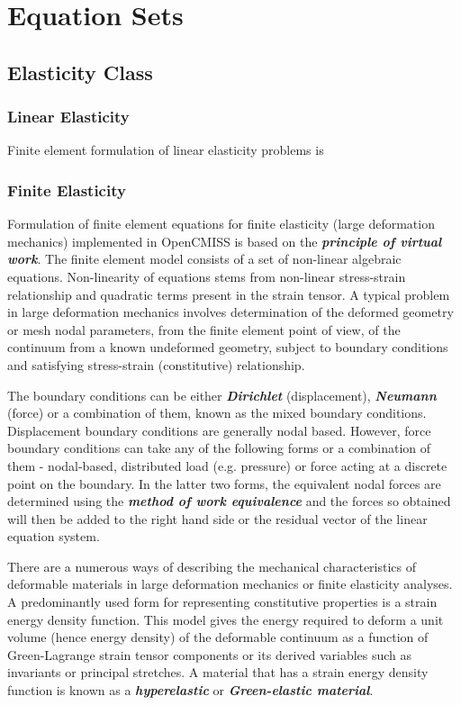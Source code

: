 \clearemptydoublepage
\chapter{Equation Sets}
\label{cha:equationsets}

\section{Elasticity Class}

\subsection{Linear Elasticity}

Finite element formulation of linear elasticity problems is

\subsection{Finite Elasticity}

Formulation of finite element equations for finite elasticity (large deformation mechanics) implemented in OpenCMISS is based on the 
\textit{\textbf{principle of virtual work}}. The finite element model consists of a set of non-linear algebraic equations. Non-linearity of 
equations stems from non-linear stress-strain relationship and quadratic terms present in the strain tensor. A typical problem in large deformation 
mechanics involves determination of the deformed geometry or mesh nodal parameters, from the finite element point of view, of the continuum 
from a known undeformed geometry, subject to boundary conditions and satisfying stress-strain (constitutive) relationship. 
  
The boundary conditions can be either \textit{\textbf{Dirichlet}} (displacement), \textit{\textbf{Neumann}} (force) or a combination of them, known 
as the mixed boundary conditions. Displacement boundary conditions are generally nodal based. However, force boundary conditions can take 
any of the following forms or a combination of them - nodal-based, distributed load (e.g. pressure) or force acting at a discrete point 
on the boundary. In the latter two forms, the equivalent nodal forces are determined using the \textit{\textbf{method of work equivalence}} 
\cite{hutton:2004} and the forces so obtained will then be added to the right hand side or the residual vector of the linear equation system.  

There are a numerous ways of describing the mechanical characteristics of deformable materials in large deformation mechanics or finite elasticity
analyses. A predominantly used form for representing constitutive properties is a strain energy density function. This model gives the energy 
required to deform a unit volume (hence energy density) of the deformable continuum as a function of Green-Lagrange strain tensor components or its 
derived variables such as invariants or principal stretches. A material that has a strain energy density function is known as a 
\textit{\textbf{hyperelastic}} or \textit{\textbf{Green-elastic material}}. 

